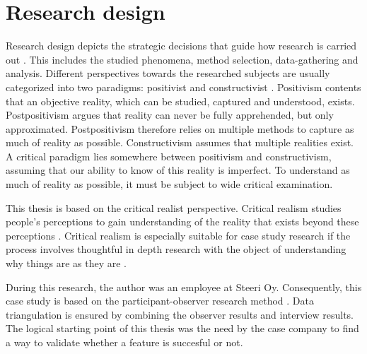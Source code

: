 \documentclass[english]{tktltiki2}
\theoremstyle{definition}
\theoremstyle{remark}
\begin{document}
\section{Research design}
Research design depicts the strategic decisions that guide how research is carried out \cite{denzin2000discipline}. This includes the studied phenomena, method selection, data-gathering and analysis. Different perspectives towards the researched subjects are usually categorized into two paradigms: positivist and constructivist \cite{gephart2004qualitative}. Positivism contents that an objective reality, which can be studied, captured and understood, exists. Postpositivism argues that reality can never be fully apprehended, but only approximated. Postpositivism therefore relies on multiple methods to capture as much of reality as possible. Constructivism assumes that multiple realities exist. A critical paradigm lies somewhere between positivism and constructivism, assuming that our ability to know of this reality is imperfect. To understand as much of reality as possible, it must be subject to wide critical examination. 

This thesis is based on the critical realist perspective. Critical realism studies people's perceptions to gain understanding of the reality that exists beyond these perceptions \cite{healy2000comprehensive}. Critical realism is especially suitable for case study research if the process involves thoughtful in depth research with the object of understanding why things are as they are \cite{easton2010critical}. 

During this research, the author was an employee at Steeri Oy. Consequently, this case study is based on the participant-observer research method \cite{strauss1990basics}. Data triangulation is ensured by combining the observer results and interview results. The logical starting point of this thesis was the need by the case company to find a way to validate whether a feature is succesful or not. 

\end{document}
